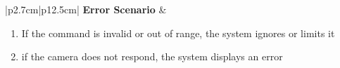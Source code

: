 \begin{table}[H]
\begin{tabular}{|p{2.7cm}|p{12.5cm}|}
            \hline
            \textbf{Error Scenario} & \begin{minipage}[t]{\linewidth}
                                          \begin{enumerate}[topsep=0pt,itemsep=1pt,parsep=0pt,partopsep=0pt]
                                              \item If the command is invalid or out of range, the system ignores or limits it
                                              \item if the camera does not respond, the system displays an error
                                          \end{enumerate}
                                      \end{minipage} \\
            \hline
        \end{tabular}
        \label{tab:eng-ptz-move}
    \end{table}
